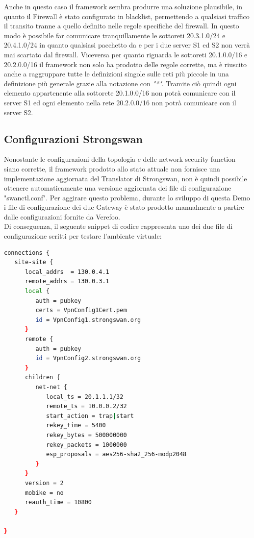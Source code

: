 Anche in questo caso il framework sembra produrre una soluzione plausibile, in quanto il Firewall è stato configurato in blacklist, permettendo a qualsiasi traffico il transito tranne a quello 
definito nelle regole specifiche del firewall. In questo modo è possibile far comunicare tranquillamente le sottoreti 20.3.1.0/24 e 20.4.1.0/24 in quanto qualsiasi pacchetto da e per i due server S1 ed S2 non verrà
mai scartato dal firewall. Viceversa per quanto riguarda le sottoreti 20.1.0.0/16 e 20.2.0.0/16 il framework non solo ha prodotto delle regole corrette, ma è riuscito anche a raggruppare tutte le definizioni singole sulle reti più piccole in una
definizione più generale grazie alla notazione con \textit{"*"}. Tramite ciò quindi ogni elemento appartenente alla sottorete 20.1.0.0/16 non potrà comunicare con il server S1 ed ogni elemento nella rete 20.2.0.0/16 non potrà comunicare con il server S2.

\subsection{Configurazioni Strongswan}
Nonostante le configurazioni della topologia e delle network security function siano corrette, il framework prodotto allo stato attuale non fornisce una implementazione aggiornata del Translator di Strongswan, non è quindi possibile ottenere automaticamente 
una versione aggiornata dei file di configurazione "swanctl.conf". Per aggirare questo problema, durante lo sviluppo di questa Demo i file di configurazione dei due Gateway è stato prodotto manualmente a partire dalle configurazioni fornite da Verefoo. \\
Di conseguenza, il seguente snippet di codice rappresenta uno dei due file di configurazione scritti per testare l'ambiente virtuale:

\begin{lstlisting}[language=sh]
    connections {
   site-site {
      local_addrs  = 130.0.4.1
      remote_addrs = 130.0.3.1
      local {
         auth = pubkey
         certs = VpnConfig1Cert.pem
         id = VpnConfig1.strongswan.org
      }
      remote {
         auth = pubkey
         id = VpnConfig2.strongswan.org
      }
      children {
         net-net {
            local_ts = 20.1.1.1/32            
            remote_ts = 10.0.0.2/32            
            start_action = trap|start 
            rekey_time = 5400
            rekey_bytes = 500000000
            rekey_packets = 1000000
            esp_proposals = aes256-sha2_256-modp2048
         }
      }
      version = 2
      mobike = no
      reauth_time = 10800
   }
   
}
\end{lstlisting}

